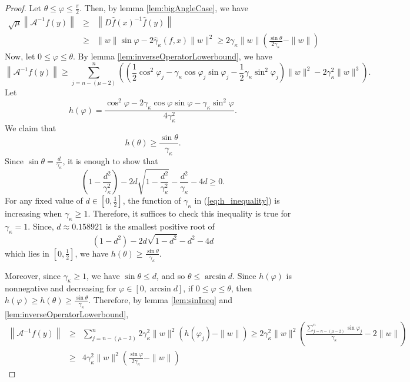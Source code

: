 \documentclass[12pt,oneside,reqno]{amsart}
\theoremstyle{definition}
\begin{document}
		\begin{proof}
			Let $\theta\leq \varphi\leq \frac{\pi}{2}$. Then, by lemma \ref{lem:bigAngleCase}, we have
			{\footnotesize
				\begin{eqnarray*}
					\sqrt{\mu}\left\|\mathcal{A}^{-1}f(y)\right\| & \geq &   \left\|D\hat{f}(x)^{-1}\hat{f}(y)\right\|\\
					&\geq & \|w\|\sin\varphi -2\hat{\gamma}_\kappa(f,x)\|w\|^2 \geq 2\gamma_\kappa\|w\|\left(\frac{\sin\theta}{2\gamma_\kappa}-\|w\|\right)
				\end{eqnarray*}}
				Now, let $0\leq \varphi \leq \theta$. By lemma \ref{lem:inverseOperatorLowerbound}, we have
				{\footnotesize
					\[\left\|\mathcal{A}^{-1}f(y)\right\|\geq \sum\limits_{j=n-(\mu-2)}^n\left(\left(\frac{1}{2}\cos^2\varphi_{j}-\gamma_{\kappa}\cos\varphi_j\sin\varphi_j-\frac{1}{2}\gamma_{\kappa}\sin^2\varphi_j\right)\|w\|^2 -2\gamma_{\kappa}^2\|w\|^3\right).\]}
				Let 
				{\footnotesize
					\[h(\varphi) = \frac{\cos^2 \varphi - 2\gamma_\kappa \cos\varphi \sin\varphi - \gamma_\kappa\sin^2\varphi}{4\gamma_\kappa^2}.\]}
				We claim that 
				\[h(\theta)\geq \frac{\sin\theta}{\gamma_\kappa}.\]
				Since $\sin\theta=\frac{d}{\gamma_\kappa}$, it is enough to show that
				{\footnotesize
					\begin{equation}\label{eq:h_inequality}
					\left(1-\frac{d^2}{\gamma_\kappa^2}\right)-2d\sqrt{1-\frac{d^2}{\gamma_\kappa^2}}-\frac{d^2}{\gamma_\kappa}-4d\geq 0.
					\end{equation}}
				For any fixed value of $d\in \left[0,\frac{1}{2}\right]$, the function of $\gamma_\kappa$ in (\ref{eq:h_inequality}) is increasing when $\gamma_\kappa\geq 1$. Therefore, it suffices to check this inequality is true for $\gamma_\kappa=1$. Since, $d\approx 0.158921$ is the smallest positive root of
				\[(1-d^2)-2d\sqrt{1-d^2}-d^2-4d\]
				which lies in $\left[0,\frac{1}{2}\right]$, we have $h(\theta)\geq\frac{\sin\theta}{\gamma_\kappa}$.
				
				Moreover, since $\gamma_\kappa\geq 1$, we have $\sin \theta \leq d$, and so $\theta \leq \arcsin d$. Since $h(\varphi)$ is nonnegative and decreasing for $\varphi\in \left[0,\arcsin d\right]$, if $0\leq \varphi \leq \theta$, then $h(\varphi)\geq h(\theta)\geq\frac{\sin \theta}{\gamma_\kappa}$. Therefore, by lemma \ref{lem:sinIneq} and \ref{lem:inverseOperatorLowerbound},
				{\footnotesize \begin{eqnarray*}
						\left\|\mathcal{A}^{-1}f(y)\right \|&\geq& \sum\limits_{j=n-(\mu-2)}^n 2\gamma_\kappa^2\|w\|^2\left(h(\varphi_{j})-\|w\|\right)\geq 2\gamma_\kappa^2\|w\|^2\left(\frac{\sum\limits_{j=n-(\mu-2)}^n\sin\varphi_j}{\gamma_\kappa}-2\|w\|\right)\\
						& \geq & 4\gamma_\kappa^2\|w\|^2\left(\frac{\sin\varphi}{2\gamma_\kappa}-\|w\|\right)
					\end{eqnarray*}}
				\end{proof}
\end{document}
